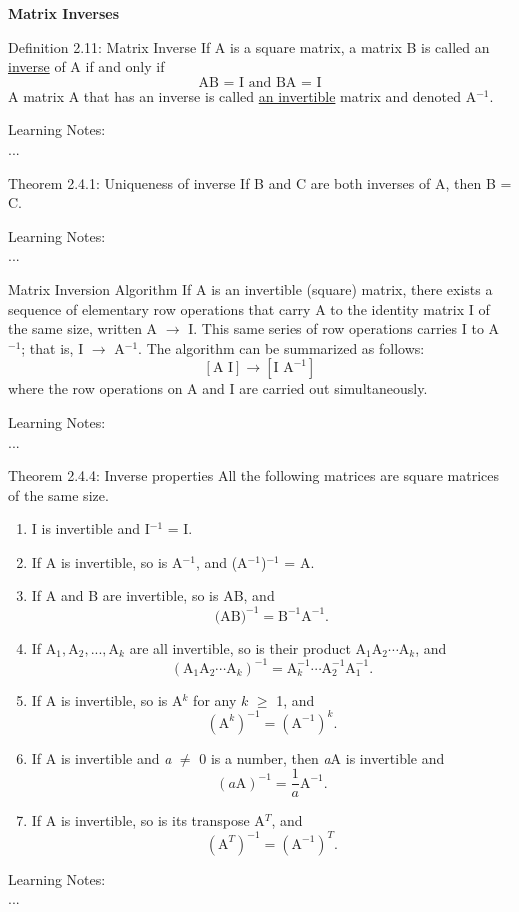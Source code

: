 \documentclass[
  12pt,
  a4paper,
]{article}
\begin{document}
\textbf{Matrix Inverses}

\begin{box_purple}{Definition 2.11: Matrix Inverse 
}
If A is a square matrix, a matrix B is called an \underline{inverse} of A if and only if
$$\text{AB = I and BA = I}$$
A matrix A that has an inverse is called \underline{an invertible} matrix and denoted A$^{-1}$.
\end{box_purple}
\noindent
Learning Notes:
\\...

\begin{box_purple}{Theorem 2.4.1: Uniqueness of inverse }
If B and C are both inverses of A, then B = C.
\end{box_purple}
\noindent
Learning Notes:
\\...

\begin{box_purple}{Matrix Inversion Algorithm}
If A is an invertible (square) matrix, there exists a sequence of elementary row operations that carry
A to the identity matrix I of the same size, written A $\xrightarrow{}$ I. This same series of row operations
carries I to A$^{-1}$; that is, I $\xrightarrow{}$ A$^{-1}$. The algorithm can be summarized as follows:
$$[\text{A I}] \xrightarrow{} [\text{I A}^{-1}]$$
where the row operations on A and I are carried out simultaneously.
\end{box_purple}
\noindent
Learning Notes:
\\...

\begin{box_purple}{Theorem 2.4.4: Inverse properties}
All the following matrices are square matrices of the same size.
\begin{enumerate}
    \item I is invertible and I$^{-1}$ = I.
    \item If A is invertible, so is A$^{-1}$, and (A$^{-1}$)$^{-1}$ = A.
    \item  If A and B are invertible, so is AB, and 
    $$\text{(AB)}^{-1} = \text{B}^{-1}\text{A}^{-1}.$$
    \item  If $\text{A}_1, \text{A}_2, ..., \text{A}_k$ are all invertible, so is their product $\text{A}_1\text{A}_2 \cdots \text{A}_k$, and
    $$(\text{A}_1\text{A}_2 \cdots\text{A}_k)^{-1} = \text{A}_k^{-1}\cdots\text{A}_2^{-1}\text{A}_1^{-1}.$$
    \item If A is invertible, so is A$^{k}$ for any $k$ $\geq$ 1, and
    $$(\text{A}^k)^{-1} = (\text{A}^{-1})^k.$$
    \item  If A is invertible and \textit{a} $\neq$ 0 is a number, then \textit{a}A is invertible and  
    $$(a\text{A})^{-1} = \frac{1}{a}\text{A}^{-1}.$$
    \item If A is invertible, so is its transpose A$^T$, and
    $$(\text{A}^T)^{-1} = (\text{A}^{-1})^T.$$
\end{enumerate}
\end{box_purple}
\noindent
Learning Notes:
\\...
\end{document}
